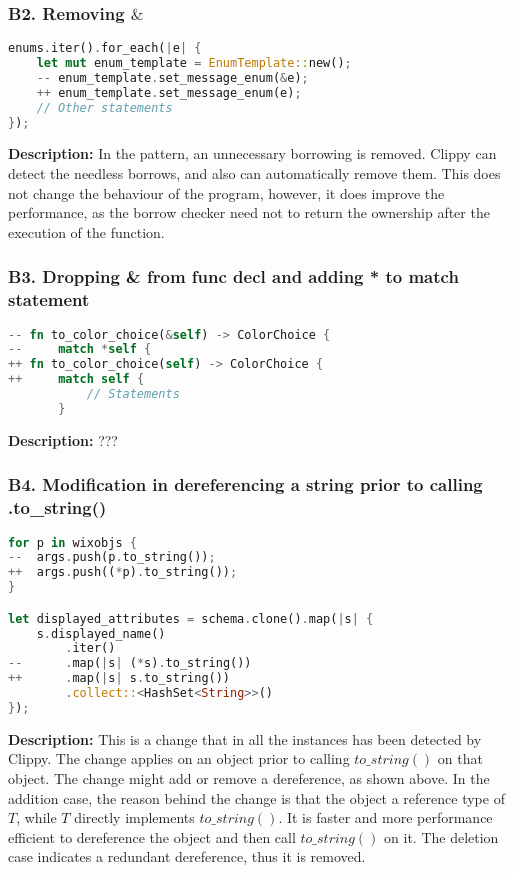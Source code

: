 \subsubsection{B2. Removing $\&$}


\begin{lstlisting}[language=Rust, style=colouredRust, label={l3}]
enums.iter().for_each(|e| {
    let mut enum_template = EnumTemplate::new();
    -- enum_template.set_message_enum(&e);
    ++ enum_template.set_message_enum(e);
    // Other statements
});
\end{lstlisting}

\noindent \textbf{Description:} In the pattern, an unnecessary borrowing is removed. Clippy can detect the needless borrows, and also can automatically remove them. This does not change the behaviour of the program, however, it does improve the performance, as the borrow checker need not to return the ownership after the execution of the function.

\subsubsection{B3. Dropping \& from func decl and adding * to match statement}

\begin{lstlisting}[language=Rust, style=colouredRust, label={l3}]
-- fn to_color_choice(&self) -> ColorChoice {
--     match *self {
++ fn to_color_choice(self) -> ColorChoice {
++     match self {
           // Statements
       }
\end{lstlisting}

\noindent \textbf{Description:} ???


\subsubsection{B4. Modification in dereferencing a string prior to calling .to\_string()}

\begin{lstlisting}[language=Rust, style=colouredRust, label={l3}]
for p in wixobjs {
--  args.push(p.to_string());
++  args.push((*p).to_string());
}

let displayed_attributes = schema.clone().map(|s| {
    s.displayed_name()
        .iter()
--      .map(|s| (*s).to_string())
++      .map(|s| s.to_string())
        .collect::<HashSet<String>>()
});
\end{lstlisting}

\noindent \textbf{Description:} This is a change that in all the instances has been detected by Clippy. The change applies on an object prior to calling $to\_string()$ on that object. The change might add or remove a dereference, as shown above. In the addition case, the reason behind the change is that the object a reference type of $T$, while $T$ directly implements $to\_string()$. It is faster and more performance efficient to dereference the object and then call $to\_string()$ on it. The deletion case indicates a redundant dereference, thus it is removed.


